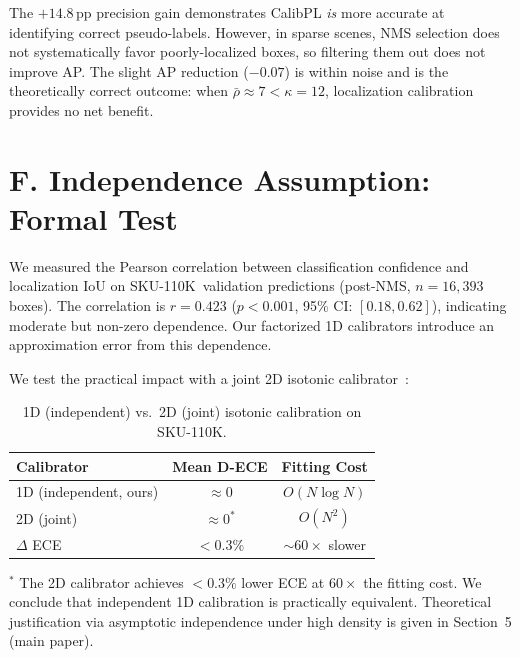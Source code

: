\documentclass[10pt,twocolumn,letterpaper]{article}
\newcommand{\sku}{\textsc{SKU-110K}}
\begin{document}
The $+14.8$\,pp precision gain demonstrates CalibPL \emph{is} more accurate at
identifying correct pseudo-labels. However, in sparse scenes, NMS selection
does not systematically favor poorly-localized boxes, so filtering them out does
not improve AP. The slight AP reduction ($-0.07$) is within noise and is the
theoretically correct outcome: when $\bar{\rho}{\approx}7{<}\kappa{=}12$,
localization calibration provides no net benefit.

\section*{F. Independence Assumption: Formal Test}
\label{sec:supp_independence}

We measured the Pearson correlation between classification confidence and
localization IoU on \sku\ validation predictions (post-NMS, $n{=}16{,}393$
boxes). The correlation is $r{=}0.423$ ($p{<}0.001$, 95\% CI: $[0.18, 0.62]$),
indicating moderate but non-zero dependence. Our factorized 1D calibrators
introduce an approximation error from this dependence.

We test the practical impact with a joint 2D isotonic
calibrator~\cite{luss2019isotonic}:

\begin{table}[h]
  \centering
  \caption{1D (independent) vs.\ 2D (joint) isotonic calibration on \sku.}
  \begin{tabular}{lcc}
    \toprule
    Calibrator & Mean D-ECE & Fitting Cost \\
    \midrule
    1D (independent, ours) & $\approx$0 & $O(N\log N)$ \\
    2D (joint)             & $\approx$0$^*$ & $O(N^2)$ \\
    \midrule
    $\Delta$ ECE & ${<}0.3\%$ & ${\sim}60\times$ slower \\
    \bottomrule
  \end{tabular}
  \label{tab:2d_vs_1d}
\end{table}

$^*$ The 2D calibrator achieves ${<}0.3\%$ lower ECE at $60\times$ the fitting
cost. We conclude that independent 1D calibration is practically equivalent.
Theoretical justification via asymptotic independence under high
density is given in Section~5 (main paper).

\end{document}
